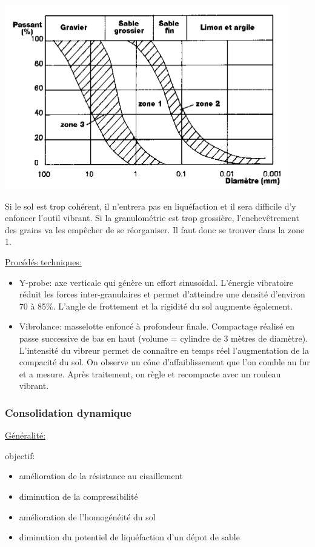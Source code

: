 \begin{center}
\includegraphics [scale=0.5]{pictures/gr.PNG}
\end{center}

Si le sol est trop cohérent, il n'entrera pas en liquéfaction et il sera difficile d'y enfoncer l'outil vibrant. Si la granulométrie est trop grossière, l'enchevêtrement des grains va les empêcher de se réorganiser. Il faut donc se trouver dans la zone 1.

\underline{Procédés techniques:}

\begin{itemize}
    \item Y-probe: axe verticale qui génère un effort sinusoïdal. L'énergie vibratoire réduit les forces inter-granulaires et permet d'atteindre une densité d'environ 70 à 85\%. L'angle de frottement et la rigidité du sol augmente également.
    \item Vibrolance: masselotte enfoncé à profondeur finale. Compactage réalisé en passe successive de bas en haut (volume = cylindre de 3 mètres de diamètre). L'intensité du vibreur permet de connaître en temps réel l'augmentation de la compacité du sol. On observe un cône d'affaiblissement que l'on comble au fur et a mesure. Après traitement, on règle et recompacte avec un rouleau vibrant.
\end{itemize}

\medskip

\subsubsection{Consolidation dynamique}

\underline{Généralité:}

objectif:
\begin{itemize}
    \item amélioration de la résistance au cisaillement
    \item diminution de la compressibilité
    \item amélioration de l'homogénéité du sol
    \item diminution du potentiel de liquéfaction d'un dépot de sable
\end{itemize}

